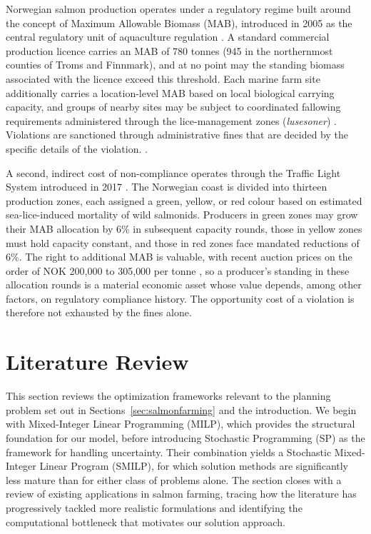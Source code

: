 \documentclass[12pt,a4paper]{article}
\begin{document}
Norwegian salmon production operates under a regulatory regime built around the concept of Maximum Allowable Biomass (MAB), introduced in 2005 as the central regulatory unit of aquaculture regulation \citep{hersoug2021}. A standard commercial production licence carries an MAB of 780 tonnes (945 in the northernmost counties of Troms and Finnmark), and at no point may the standing biomass associated with the licence exceed this threshold. Each marine farm site additionally carries a location-level MAB based on local biological carrying capacity, and groups of nearby sites may be subject to coordinated fallowing requirements administered through the lice-management zones (\emph{lusesoner}) \citep{mattilsynet_brakklegging2}. Violations are sanctioned through administrative fines that are decided by the specific details of the violation. \citep{akvakulturlovenSec30, prop103L2013}.
 
A second, indirect cost of non-compliance operates through the Traffic Light System introduced in 2017 \citep{NFD2017}. The Norwegian coast is divided into thirteen production zones, each assigned a green, yellow, or red colour based on estimated sea-lice-induced mortality of wild salmonids. Producers in green zones may grow their MAB allocation by 6\% in subsequent capacity rounds, those in yellow zones must hold capacity constant, and those in red zones face mandated reductions of 6\%. The right to additional MAB is valuable, with recent auction prices on the order of NOK 200{,}000 to 305{,}000 per tonne \citep{bahr2025}, so a producer's standing in these allocation rounds is a material economic asset whose value depends, among other factors, on regulatory compliance history. The opportunity cost of a violation is therefore not exhausted by the fines alone.
 
 
\section{Literature Review}
This section reviews the optimization frameworks relevant to the planning problem set out in Sections~\ref{sec:salmonfarming} and the introduction. We begin with Mixed-Integer Linear Programming (MILP), which provides the structural foundation for our model, before introducing Stochastic Programming (SP) as the framework for handling uncertainty. Their combination yields a Stochastic Mixed-Integer Linear Program (SMILP), for which solution methods are significantly less mature than for either class of problems alone. The section closes with a review of existing applications in salmon farming, tracing how the literature has progressively tackled more realistic formulations and identifying the computational bottleneck that motivates our solution approach.
 
\end{document}
